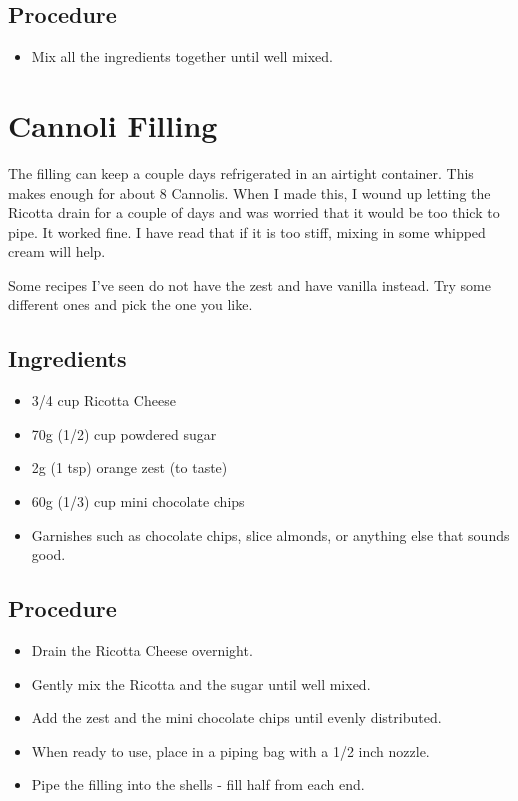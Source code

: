 \documentclass[10pt, openany]{book}
\begin{document}
\subsection{Procedure}
\begin{itemize}
  \item Mix all the ingredients together until well mixed.
\end{itemize}

\section{Cannoli Filling}
\label{extra:CannoliFilling}
The filling can keep a couple days refrigerated in an airtight container.  This makes enough for about 8 Cannolis.  When I made this, I wound up letting the Ricotta drain for a couple of days and was worried that it would be too thick to pipe.  It worked fine.  I have read that if it is too stiff, mixing in some whipped cream will help.

Some recipes I've seen do not have the zest and have vanilla instead.  Try some different ones and pick the one you like.
\subsection{Ingredients}
\begin{itemize}
  \item 3/4 cup Ricotta Cheese
  \item 70g (1/2) cup powdered sugar
  \item 2g (1 tsp) orange zest (to taste)
  \item 60g (1/3) cup mini chocolate chips
  \item Garnishes such as chocolate chips, slice almonds, or anything else that sounds good.
\end{itemize}
\subsection{Procedure}
\begin{itemize}
  \item Drain the Ricotta Cheese overnight.
  \item Gently mix the Ricotta and the sugar until well mixed.
  \item Add the zest and the mini chocolate chips until evenly distributed.
  \item When ready to use, place in a piping bag with a 1/2 inch nozzle.
  \item Pipe the filling into the shells - fill half from each end.
\end{itemize}
\end{document}
